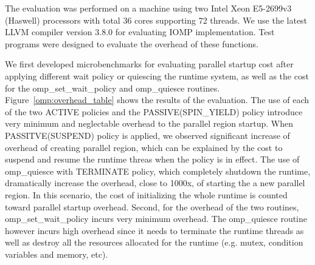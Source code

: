 The evaluation was performed on a machine using two Intel\regtm{} Xeon\regtm{} E5-2699v3 (Haswell) processors with total 36 cores supporting 72 threads. We use the latest
LLVM compiler version 3.8.0 for evaluating IOMP implementation. Test programs were designed to evaluate the overhead of these functions. 

We first developed microbenchmarks for evaluating parallel startup cost after applying different wait policy or 
quiescing the runtime system, as well as the cost for the {\sf omp\_set\_wait\_policy} and {\sf omp\_quiesce} 
routines.  
Figure~\ref{omp:overhead_table} shows the results of the evaluation. 
The use of each of the two {\sf ACTIVE} policies and the PASSIVE(SPIN\_YIELD) policy 
introduce very minimum and neglectable overhead to the {\sf parallel} region startup. 
When PASSITVE(SUSPEND) policy is applied, we observed significant increase of overhead of creating parallel region, 
which can be explained by the cost to suspend and resume the runtime threas when the policy is in effect. 
The use of {\sf omp\_quiesce} with TERMINATE policy, which completely shutdown the 
runtime, dramatically increase the overhead, close to 1000x, of starting the a new parallel region. In this 
scenario, the cost of initializing the whole runtime is counted toward {\sf parallel} startup overhead. Second, 
for the overhead of the two routines, {\sf omp\_set\_wait\_policy} incurs very minimum overhead. The 
{\sf omp\_quiesce} routine however incurs high overhead since it needs to terminate the runtime threads as well as 
destroy all the resources allocated for the runtime (e.g. mutex, condition variables and memory, etc). 



